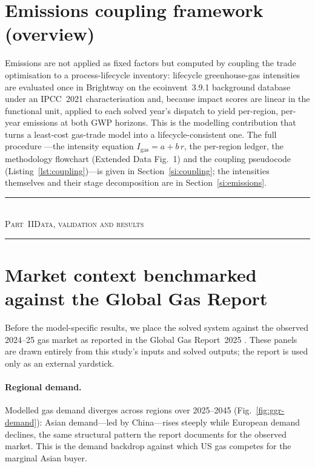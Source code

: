 \documentclass[11pt]{article}
\begin{document}
\section{Emissions coupling framework (overview)}\label{si:coupling-fwd}

Emissions are not applied as fixed factors but computed by coupling the trade
optimisation to a process-lifecycle inventory: lifecycle greenhouse-gas
intensities are evaluated once in Brightway \citep{Mutel2017, Steubing2020} on
the ecoinvent~3.9.1 background database \citep{Wernet2016} under an IPCC~2021
characterisation \citep{ipcc_ar6_wg1} and, because impact scores are linear in the functional unit,
applied to each solved year's dispatch to yield per-region, per-year emissions
at both GWP horizons. This is the modelling contribution that turns a
least-cost gas-trade model into a lifecycle-consistent one. The full procedure
---the intensity equation $I_{\mathrm{gas}}=a+b\,r$, the per-region ledger, the
methodology flowchart (Extended Data Fig.~1) and the coupling pseudocode
(Listing~\ref{lst:coupling})---is given in Section~\ref{si:coupling}; the
intensities themselves and their stage decomposition are in
Section~\ref{si:emissions}.

\begin{center}\rule{0.6\linewidth}{0.4pt}\\[2pt]
\textsc{Part~II\quad Data, validation and results}\\
\rule{0.6\linewidth}{0.4pt}\end{center}

\section{Market context benchmarked against the Global Gas Report}\label{si:market}

Before the model-specific results, we place the solved system against the
observed 2024--25 gas market as reported in the Global Gas Report~2025
\citep{ggr2025}. These panels are drawn entirely from this study's inputs and
solved outputs; the report is used only as an external yardstick.

\paragraph{Regional demand.} Modelled gas demand diverges across regions over
2025--2045 (Fig.~\ref{fig:ggr-demand}): Asian demand---led by China---rises
steeply while European demand declines, the same structural pattern the report
documents for the observed market. This is the demand backdrop against which US
gas competes for the marginal Asian buyer.
\end{document}
